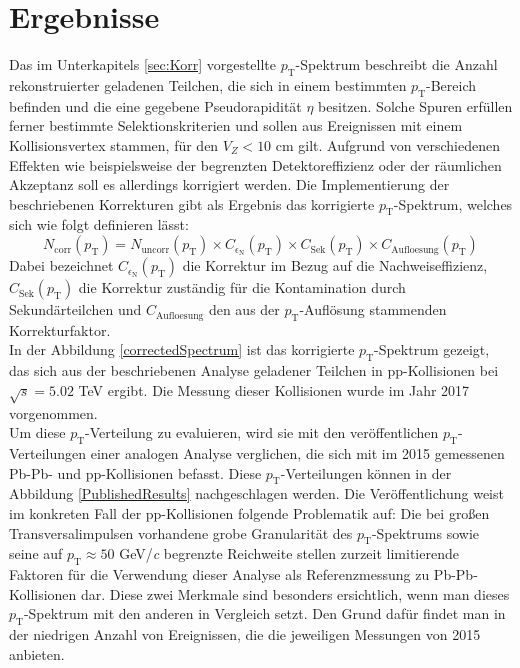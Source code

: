 \documentclass[12pt,a4paper]{report}
\begin{document}
\section{Ergebnisse}
\label{sec:Ergebnisse}
Das im Unterkapitels \ref{sec:Korr} vorgestellte $p_{\mathrm{T}}$-Spektrum beschreibt die Anzahl rekonstruierter geladenen Teilchen, die sich in einem bestimmten $p_{\mathrm{T}}$-Bereich befinden und die eine gegebene Pseudorapidität $\eta$ besitzen. Solche Spuren erfüllen ferner bestimmte Selektionskriterien und sollen aus Ereignissen mit einem Kollisionsvertex stammen, für den $V_{Z} < 10$ cm gilt. Aufgrund von verschiedenen Effekten wie beispielsweise der begrenzten Detektoreffizienz oder der räumlichen Akzeptanz soll es allerdings korrigiert werden. Die Implementierung der beschriebenen Korrekturen gibt als Ergebnis das korrigierte $p_{\mathrm{T}}$-Spektrum, welches sich wie folgt definieren lässt:
\begin{equation}
 N_\mathrm{corr}(p_{\mathrm{T}}) = N_{\mathrm{uncorr}}(p_{\mathrm{T}}) \times C_{\epsilon_{\mathrm{N}}}(p_{\mathrm{T}}) \times C_{\mathrm{Sek}}(p_{\mathrm{T}}) \times C_{\mathrm{Aufloesung}}(p_{\mathrm{T}})
\end{equation}
Dabei bezeichnet $C_{\epsilon_{\mathrm{N}}}(p_{\mathrm{T}})$ die Korrektur im Bezug auf die Nachweiseffizienz, $C_{\mathrm{Sek}}(p_{\mathrm{T}})$ die Korrektur zuständig für die Kontamination durch Sekundärteilchen und $C_{\mathrm{Aufloesung}}$ den aus der $p_{\mathrm{T}}$-Auflösung stammenden Korrekturfaktor.\\
In der Abbildung \ref{correctedSpectrum} ist das korrigierte $p_{\mathrm{T}}$-Spektrum gezeigt, das sich aus der beschriebenen Analyse geladener Teilchen in pp-Kollisionen bei $\sqrt{s} = 5.02$ TeV ergibt. Die Messung dieser Kollisionen wurde im Jahr 2017 vorgenommen. \\
Um diese $p_{\mathrm{T}}$-Verteilung zu evaluieren, wird sie mit den veröffentlichen $p_{\mathrm{T}}$-Verteilungen einer analogen Analyse verglichen, die sich mit im 2015 gemessenen Pb-Pb- und pp-Kollisionen befasst. Diese $p_{\mathrm{T}}$-Verteilungen können in der Abbildung \ref{PublishedResults} nachgeschlagen werden. Die Veröffentlichung weist im konkreten Fall der pp-Kollisionen folgende Problematik auf: Die bei großen Transversalimpulsen vorhandene grobe Granularität des $p_{\mathrm{T}}$-Spektrums sowie seine auf $p_{\mathrm{T}} \approx 50$ GeV/\textit{c} begrenzte Reichweite stellen zurzeit limitierende Faktoren für die Verwendung dieser Analyse als Referenzmessung zu Pb-Pb-Kollisionen dar. Diese zwei Merkmale sind besonders ersichtlich, wenn man dieses $p_{\mathrm{T}}$-Spektrum mit den anderen in Vergleich setzt. Den Grund dafür findet man in der niedrigen Anzahl von Ereignissen, die die jeweiligen Messungen von 2015 anbieten.\\ 
\end{document}
